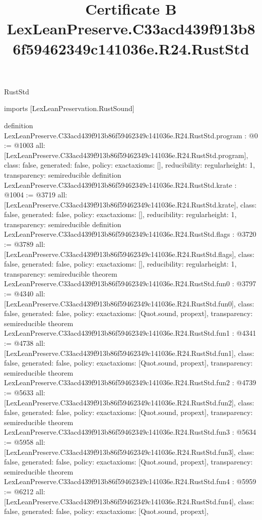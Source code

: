 \begin{lexlean}{RustStd}
\title{Certificate B LexLeanPreserve.C33acd439f913b86f59462349c141036e.R24.RustStd}
\begin{coremodule}
imports [LexLeanPreservation.RustSound]

definition LexLeanPreserve.C33acd439f913b86f59462349c141036e.R24.RustStd.program : @0 := @1003 {
  all: [LexLeanPreserve.C33acd439f913b86f59462349c141036e.R24.RustStd.program],
  class: false,
  generated: false,
  policy: exact{axioms: []},
  reducibility: regular{height: 1},
  transparency: semireducible
}
definition LexLeanPreserve.C33acd439f913b86f59462349c141036e.R24.RustStd.krate : @1004 := @3719 {
  all: [LexLeanPreserve.C33acd439f913b86f59462349c141036e.R24.RustStd.krate],
  class: false,
  generated: false,
  policy: exact{axioms: []},
  reducibility: regular{height: 1},
  transparency: semireducible
}
definition LexLeanPreserve.C33acd439f913b86f59462349c141036e.R24.RustStd.flags : @3720 := @3789 {
  all: [LexLeanPreserve.C33acd439f913b86f59462349c141036e.R24.RustStd.flags],
  class: false,
  generated: false,
  policy: exact{axioms: []},
  reducibility: regular{height: 1},
  transparency: semireducible
}
theorem LexLeanPreserve.C33acd439f913b86f59462349c141036e.R24.RustStd.fun0 : @3797 := @4340 {
  all: [LexLeanPreserve.C33acd439f913b86f59462349c141036e.R24.RustStd.fun0],
  class: false,
  generated: false,
  policy: exact{axioms: [Quot.sound, propext]},
  transparency: semireducible
}
theorem LexLeanPreserve.C33acd439f913b86f59462349c141036e.R24.RustStd.fun1 : @4341 := @4738 {
  all: [LexLeanPreserve.C33acd439f913b86f59462349c141036e.R24.RustStd.fun1],
  class: false,
  generated: false,
  policy: exact{axioms: [Quot.sound, propext]},
  transparency: semireducible
}
theorem LexLeanPreserve.C33acd439f913b86f59462349c141036e.R24.RustStd.fun2 : @4739 := @5633 {
  all: [LexLeanPreserve.C33acd439f913b86f59462349c141036e.R24.RustStd.fun2],
  class: false,
  generated: false,
  policy: exact{axioms: [Quot.sound, propext]},
  transparency: semireducible
}
theorem LexLeanPreserve.C33acd439f913b86f59462349c141036e.R24.RustStd.fun3 : @5634 := @5958 {
  all: [LexLeanPreserve.C33acd439f913b86f59462349c141036e.R24.RustStd.fun3],
  class: false,
  generated: false,
  policy: exact{axioms: [Quot.sound, propext]},
  transparency: semireducible
}
theorem LexLeanPreserve.C33acd439f913b86f59462349c141036e.R24.RustStd.fun4 : @5959 := @6212 {
  all: [LexLeanPreserve.C33acd439f913b86f59462349c141036e.R24.RustStd.fun4],
  class: false,
  generated: false,
  policy: exact{axioms: [Quot.sound, propext]},
}
\end{coremodule}
\end{lexlean}
